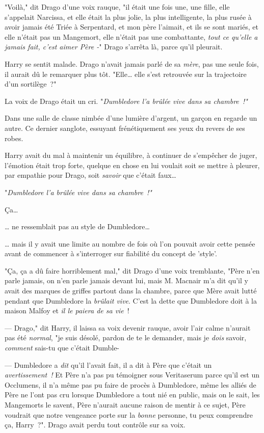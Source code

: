 "Voilà," dit Drago d'une voix rauque, "il était une fois une, une fille, elle s'appelait Narcissa, et elle était la plus jolie, la plus intelligente, la plus rusée à avoir jamais été Triée à Serpentard, et mon père l'aimait, et ils se sont mariés, et elle n'était pas un Mangemort, elle n'était pas une combattante, \emph{tout ce qu'elle a jamais fait, c'est aimer Père -}" Drago s'arrêta là, parce qu'il pleurait.

Harry se sentit malade. Drago n'avait jamais parlé de sa \emph{mère}, pas une seule fois, il aurait dû le remarquer plus tôt. "Elle… elle s'est retrouvée sur la trajectoire d'un sortilège~?"

La voix de Drago était un cri. "\emph{Dumbledore l'a brûlée vive dans sa chambre~!"}

\later

Dans une salle de classe nimbée d'une lumière d'argent, un garçon en regarde un autre. Ce dernier sanglote, essuyant frénétiquement ses yeux du revers de ses robes.

Harry avait du mal à maintenir un équilibre, à continuer de s'empêcher de juger, l'émotion était trop forte, quelque en chose en lui voulait soit se mettre à pleurer, par empathie pour Drago, soit \emph{savoir} que c'était faux…

"\emph{Dumbledore l'a brûlée vive dans sa chambre~!"}

Ça…

… ne ressemblait pas au style de Dumbledore…

… mais il y avait une limite au nombre de fois où l'on pouvait avoir cette pensée avant de commencer à s'interroger sur fiabilité du concept de 'style'.

"Ça, ça a dû faire horriblement mal," dit Drago d'une voix tremblante, "Père n'en parle jamais, on n'en parle jamais devant lui, mais M. Macnair m'a dit qu'il y avait des marques de griffes partout dans la chambre, parce que Mère avait lutté pendant que Dumbledore la \emph{brûlait vive}. C'est la dette que Dumbledore doit à la maison Malfoy et \emph{il le paiera de sa vie}~!

--- Drago," dit Harry, il laissa sa voix devenir rauque, avoir l'air calme n'aurait pas été \emph{normal}, "je suis désolé, pardon de te le demander, mais je \emph{dois} savoir, \emph{comment} sais-tu que c'était Dumble-

--- Dumbledore a \emph{dit} qu'il l'avait fait, il a dit à Père que c'était un \emph{avertissement~!} Et Père n'a pas pu témoigner sous Veritaserum parce qu'il est un Occlumens, il n'a même pas pu faire de procès à Dumbledore, même les alliés de Père ne l'ont pas cru lorsque Dumbledore a tout nié en public, mais on le sait, les Mangemorts le savent, Père n'aurait aucune raison de mentir à ce sujet, Père voudrait que notre vengeance porte sur la \emph{bonne} personne, tu peux comprendre ça, Harry~?". Drago avait perdu tout contrôle sur sa voix.

